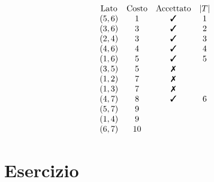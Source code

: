 \documentclass[10pt,a4paper,twoside,openright]{book}
\newcommand{\cmark}{\ding{51}}%
\newcommand{\xmark}{\ding{55}}%
\newcounter{es}
\newcommand{\Es}{
	\stepcounter{es}
	\section{Esercizio \arabic{es}}
	}
\numberwithin{es}{chapter}
\begin{document}
\begin{figure}[htpb]
\begin{tikzpicture}[x=0.75pt,y=0.75pt,yscale=-1,xscale=1]
	\end{tikzpicture}
\end{figure}
\FloatBarrier

\begin{equation*}
\begin{array}{ c c c c }
\text{Lato} & \text{Costo} & \text{Accettato} & | T| \\
( 5,6) & 1 & \text{\cmark}  & 1\\
( 3,6) & 3 & \text{\cmark}  & 2\\
( 2,4) & 3 & \text{\cmark}  & 3\\
( 4,6) & 4 & \text{\cmark}  & 4\\
( 1,6) & 5 & \text{\cmark}  & 5\\
( 3,5) & 5 & \text{\xmark}  & \\
( 1,2) & 7 & \text{\xmark}  & \\
( 1,3) & 7 & \text{\xmark}  & \\
( 4,7) & 8 & \text{\cmark}  & 6\\
( 5,7) & 9 &  & \\
( 1,4) & 9 &  & \\
( 6,7) & 10 &  & 
\end{array}
\end{equation*}
\Es
\end{document}
